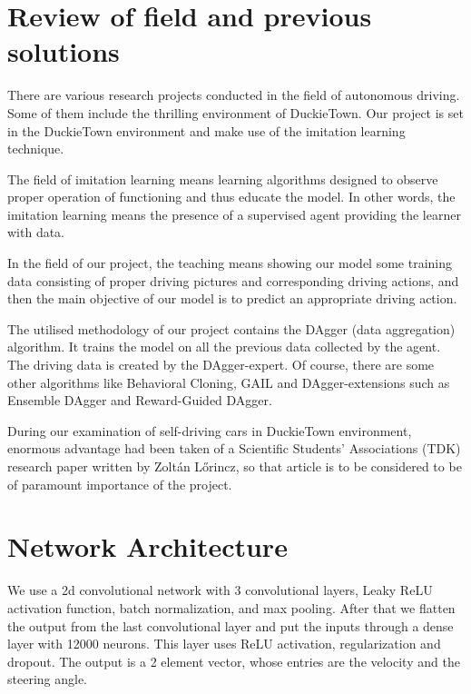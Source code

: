 \documentclass{article}
\begin{document}
\section*{Review of field and previous solutions}

There are various research projects conducted in the field of autonomous driving. Some of them include the thrilling environment of DuckieTown. Our project is set in the DuckieTown environment and make use of the imitation learning technique.

The field of imitation learning means learning algorithms designed to observe proper operation of functioning and thus educate the model. In other words, the imitation learning means the presence of a supervised agent providing the learner with data.

In the field of our project, the teaching means showing our model some training data consisting of proper driving pictures and corresponding driving actions, and then the main objective of our model is to predict an appropriate driving action.

The utilised methodology of our project contains the DAgger (data aggregation) algorithm. It trains the model on all the previous data collected by the agent. The driving data is created by the DAgger-expert. Of course, there are some other algorithms like Behavioral Cloning, GAIL and DAgger-extensions such as Ensemble DAgger and Reward-Guided DAgger.

During our examination of self-driving cars in DuckieTown environment, enormous advantage had been taken of a Scientific Students' Associations (TDK) research paper written by Zoltán Lőrincz, so that article is to be considered to be of paramount importance of the project.


\pagebreak

\section*{Network Architecture}
We use a 2d convolutional network with 3 convolutional layers, Leaky ReLU activation function, batch normalization, and max pooling. After that we flatten the output from the last convolutional layer and put the inputs through a dense layer with 12000 neurons. This layer uses ReLU activation, regularization and dropout. The output is a 2 element vector, whose entries are the velocity and the steering angle.
\end{document}
